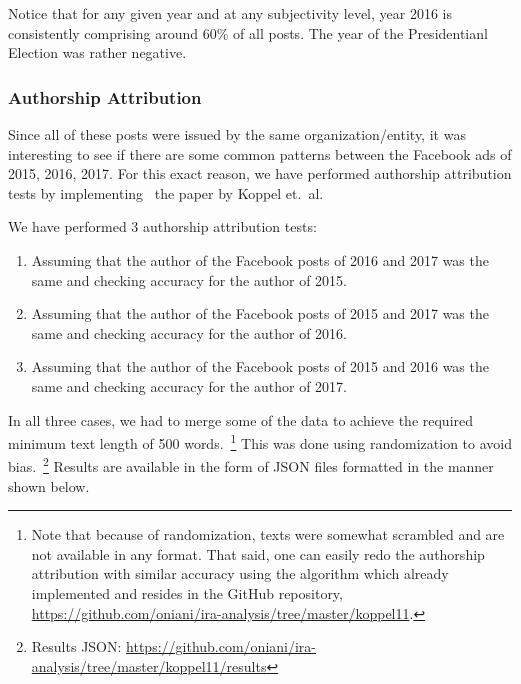 \documentclass[12pt]{article}
\theoremstyle{definition}
\begin{document}
\bigskip

Notice that for any given year and at any subjectivity level, year 2016 is
consistently comprising around 60\% of all posts. The year of the Presidentianl
Election was rather negative.


\subsubsection*{\centering Authorship Attribution}

Since all of these posts were issued by the same organization/entity, it was
interesting to see if there are some common patterns between the Facebook ads
of 2015, 2016, 2017. For this exact reason, we have performed authorship
attribution tests by implementing~\cite{koppel11} the paper by Koppel et.~al.

\bigskip

We have performed 3 authorship attribution tests:

\begin{enumerate}
  \item Assuming that the author of the Facebook posts of 2016 and 2017 was the
        same and checking accuracy for the author of 2015.

  \item Assuming that the author of the Facebook posts of 2015 and 2017 was the
        same and checking accuracy for the author of 2016.

  \item Assuming that the author of the Facebook posts of 2015 and 2016 was the
        same and checking accuracy for the author of 2017.
\end{enumerate}

In all three cases, we had to merge some of the data to achieve the required
minimum text length of 500 words.~\footnote{Note that because of randomization,
texts were somewhat scrambled and are not available in any format. That said,
one can easily redo the authorship attribution with similar accuracy using
the algorithm which already implemented and resides in the GitHub repository,
\url{https://github.com/oniani/ira-analysis/tree/master/koppel11}.}
This was done using randomization to avoid bias.~\footnote{Results JSON:
\url{https://github.com/oniani/ira-analysis/tree/master/koppel11/results}}
Results are available in the form of JSON files formatted in the manner shown
below.
\end{document}

